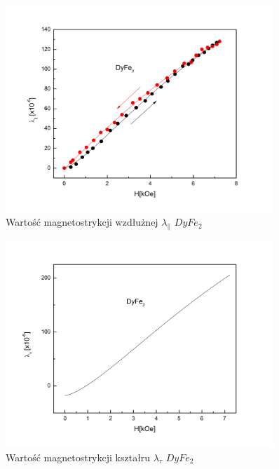 \documentclass[a4paper,12pt]{article}
\numberwithin{equation}{section}
\begin{document}
\begin{figure}[h]
    \centering
    \includegraphics[width =0.9\textwidth]{../img/magneto/Dywzdluzna}
    \caption{Wartość magnetostrykcji wzdłużnej $\lambda_{\parallel}$ $DyFe_2$}
    \label{Dywzdluzna}
\end{figure}

\begin{figure}[h]
    \centering
    \includegraphics[width =0.9\textwidth]{../img/magneto/DyKsztaltu}
    \caption{Wartość magnetostrykcji kształru $\lambda_{\tau}$ $DyFe_2$}
    \label{DyKsztaltu}
\end{figure}
\end{document}
